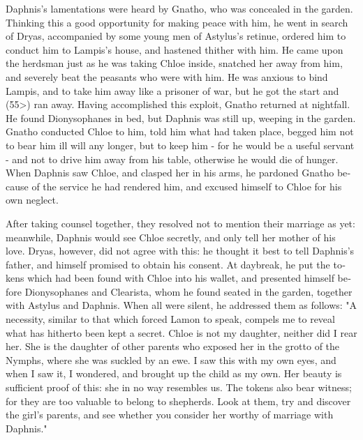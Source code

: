 \documentclass{book}
\begin{document}
\begin{pairs}
\begin{Rightside}
\begin{english}
  Daphnis's lamentations were heard by Gnatho, who was concealed in the garden.  Thinking this a good opportunity for making peace with him, he went in search of Dryas, accompanied by some young men of Astylus's retinue, ordered him to conduct him to Lampis's house, and hastened thither with him.  He came upon the herdsman just as he was taking Chloe inside, snatched her away from him, and severely beat the peasants who were with him.  He was anxious to bind Lampis, and to take him away like a prisoner of war, but he got the start and (55>) ran away.  Having accomplished this exploit, Gnatho returned at nightfall.  He found Dionysophanes in bed, but Daphnis was still up, weeping in the garden.  Gnatho conducted Chloe to him, told him what had taken place, begged him not to bear him ill will any longer, but to keep him - for he would be a useful servant - and not to drive him away from his table, otherwise he would die of hunger.  When Daphnis saw Chloe, and clasped her in his arms, he pardoned Gnatho because of the service he had rendered him, and excused himself to Chloe for his own neglect.
\pend


  After taking counsel together, they resolved not to mention their marriage as yet: meanwhile, Daphnis would see Chloe secretly, and only tell her mother of his love.  Dryas, however, did not agree with this: he thought it best to tell Daphnis's father, and himself promised to obtain his consent.  At daybreak, he put the tokens which had been found with Chloe into his wallet, and presented himself before Dionysophanes and Clearista, whom he found seated in the garden, together with Astylus and Daphnis.  When all were silent, he addressed them as follows: "A necessity, similar to that which forced Lamon to speak, compels me to reveal what has hitherto been kept a secret.  Chloe is not my daughter, neither did I rear her.  She is the daughter of other parents who exposed her in the grotto of the Nymphs, where she was suckled by an ewe.  I saw this with my own eyes, and when I saw it, I wondered, and brought up the child as my own.  Her beauty is sufficient proof of this: she in no way resembles us.  The tokens also bear witness; for they are too valuable to belong to shepherds.  Look at them, try and discover the girl's parents, and see whether you consider her worthy of marriage with Daphnis."
\pend



\end{english}
\end{Rightside}
\end{pairs}
\end{document}
